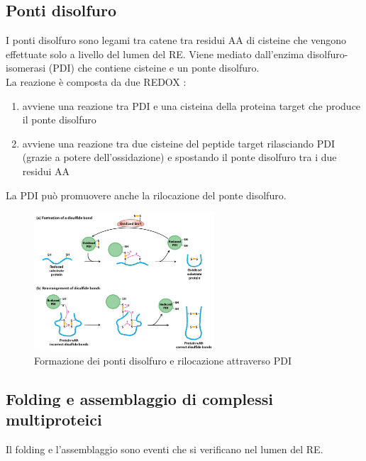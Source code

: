     \subsection{Ponti disolfuro}
        I ponti disolfuro sono legami tra catene tra residui AA di cisteine che vengono effettuate solo a livello del lumen del RE.
        Viene mediato dall'enzima disolfuro-isomerasi (PDI) che contiene cisteine e un ponte disolfuro. \\
        La reazione è composta da due REDOX :
        \begin{enumerate}
            \item avviene una reazione tra PDI e una cisteina della proteina target che produce il ponte disolfuro
            \item avviene una reazione tra due cisteine del peptide target rilasciando PDI (grazie a potere dell'ossidazione) e spostando il ponte disolfuro tra i due residui AA
        \end{enumerate}
        La PDI può promuovere anche la rilocazione del ponte disolfuro.\\

        \begin{figure}[h]
            \centering
            \includegraphics[width=0.6\textwidth]{images/pontiDisolfuro.JPG}
            \caption{\small Formazione dei ponti disolfuro e rilocazione attraverso PDI}
            \label{fig:mesh1}
        \end{figure}
        
    \subsection{Folding e assemblaggio di complessi multiproteici}
        Il folding e l'assemblaggio sono eventi che si verificano nel lumen del RE. 
